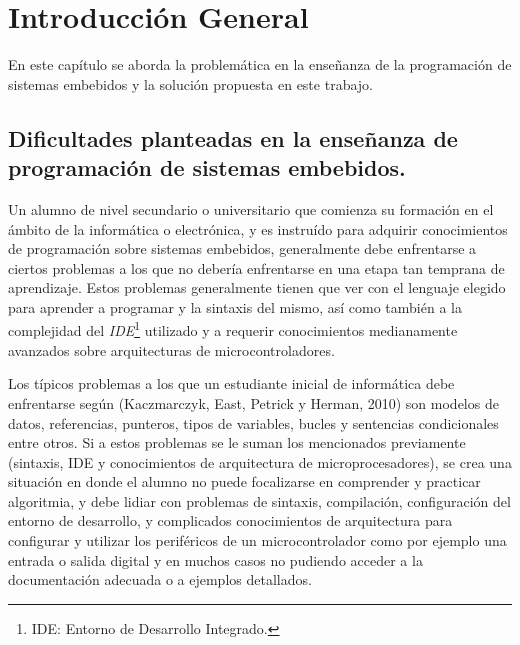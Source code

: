 
\chapter{Introducción General} %

\label{Chapter1} %
\label{IntroGeneral}


\newcommand{\keyword}[1]{\textbf{#1}}
\newcommand{\tabhead}[1]{\textbf{#1}}
\newcommand{\code}[1]{\texttt{#1}}
\newcommand{\file}[1]{\texttt{\bfseries#1}}
\newcommand{\option}[1]{\texttt{\itshape#1}}
\newcommand{\grados}{$^{\circ}$}


En este capítulo se aborda la problemática en la enseñanza de la programación de sistemas embebidos y la solución propuesta en este trabajo.

\section{Dificultades planteadas en la enseñanza de programación de sistemas embebidos.}

Un alumno de nivel secundario o universitario que comienza su formación en el ámbito de la informática o electrónica, y es instruído para adquirir conocimientos de programación sobre sistemas embebidos, generalmente debe enfrentarse a ciertos problemas a los que no debería enfrentarse en una etapa tan temprana de aprendizaje. Estos problemas generalmente tienen que ver con el lenguaje elegido para aprender a programar y la sintaxis del mismo, así como también a la complejidad del \textit{IDE}\footnote{IDE: Entorno de Desarrollo Integrado.} utilizado y a requerir conocimientos medianamente avanzados sobre arquitecturas de microcontroladores\cite{papereducacion5}. 

Los típicos problemas a los que un estudiante inicial de informática debe enfrentarse según (Kaczmarczyk, East, Petrick y Herman, 2010) \cite{papereducacion2} son modelos de datos, referencias, punteros, tipos de variables, bucles y sentencias condicionales entre otros. Si a estos problemas se le suman los mencionados previamente (sintaxis, IDE y conocimientos de arquitectura de microprocesadores), se crea una situación en donde el alumno no puede focalizarse en comprender y practicar algoritmia, y debe lidiar con problemas de sintaxis, compilación, configuración del entorno de desarrollo, y complicados conocimientos de arquitectura para configurar y utilizar los periféricos de un microcontrolador como por ejemplo una entrada o salida digital y en muchos casos no pudiendo acceder a la documentación adecuada o a ejemplos detallados. 

